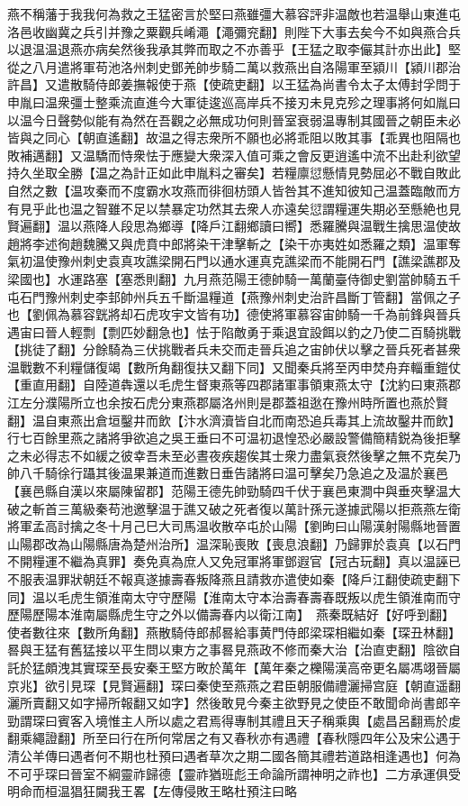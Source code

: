 燕不稱藩于我我何為救之王猛密言於堅曰燕雖彊大慕容評非温敵也若温舉山東進屯洛邑收幽冀之兵引并豫之粟觀兵崤澠【澠彌兖翻】則陛下大事去矣今不如與燕合兵以退温温退燕亦病矣然後我承其弊而取之不亦善乎【王猛之取李儼其計亦出此】堅從之八月遣將軍苟池洛州刺史鄧羌帥步騎二萬以救燕出自洛陽軍至潁川【潁川郡治許昌】又遣散騎侍郎姜撫報使于燕【使疏吏翻】以王猛為尚書令太子太傅封孚問于申胤曰温衆彊士整乘流直進今大軍徒逡巡高岸兵不接刃未見克殄之理事將何如胤曰以温今日聲勢似能有為然在吾觀之必無成功何則晉室衰弱温專制其國晉之朝臣未必皆與之同心【朝直遙翻】故温之得志衆所不願也必將乖阻以敗其事【乖異也阻隔也敗補邁翻】又温驕而恃衆怯于應變大衆深入值可乘之會反更逍遙中流不出赴利欲望持久坐取全勝【温之為計正如此申胤料之審矣】若糧廪愆懸情見勢屈必不戰自敗此自然之數【温攻秦而不度霸水攻燕而徘徊枋頭人皆咎其不進知彼知己温蓋臨敵而方有見乎此也温之智雖不足以禁暴定功然其去衆人亦遠矣愆謂糧運失期必至懸絶也見賢遍翻】温以燕降人段思為鄉導【降戶江翻鄉讀曰嚮】悉羅騰與温戰生擒思温使故趙將李述徇趙魏騰又與虎賁中郎將染干津擊斬之【染干亦夷姓如悉羅之類】温軍奪氣初温使豫州刺史袁真攻譙梁開石門以通水運真克譙梁而不能開石門【譙梁譙郡及梁國也】水運路塞【塞悉則翻】九月燕范陽王德帥騎一萬蘭臺侍御史劉當帥騎五千屯石門豫州刺史李邽帥州兵五千斷温糧道【燕豫州刺史治許昌斷丁管翻】當佩之子也【劉佩為慕容皝將却石虎攻宇文皆有功】德使將軍慕容宙帥騎一千為前鋒與晉兵遇宙曰晉人輕剽【剽匹妙翻急也】怯于陷敵勇于乘退宜設餌以釣之乃使二百騎挑戰【挑徒了翻】分餘騎為三伏挑戰者兵未交而走晉兵追之宙帥伏以擊之晉兵死者甚衆温戰數不利糧儲復竭【數所角翻復扶又翻下同】又聞秦兵將至丙申焚舟弃輜重鎧仗【重直用翻】自陸道犇還以毛虎生督東燕等四郡諸軍事領東燕太守【沈約曰東燕郡江左分濮陽所立也余按石虎分東燕郡屬洛州則是郡蓋祖逖在豫州時所置也燕於賢翻】温自東燕出倉垣鑿井而飲【汴水濟瀆皆自北而南恐追兵毒其上流故鑿井而飲】行七百餘里燕之諸將爭欲追之吳王垂曰不可温初退惶恐必嚴設警備簡精鋭為後拒擊之未必得志不如緩之彼幸吾未至必晝夜疾趨俟其士衆力盡氣衰然後擊之無不克矣乃帥八千騎徐行躡其後温果兼道而進數日垂告諸將曰温可擊矣乃急追之及温於襄邑【襄邑縣自漢以來屬陳留郡】范陽王德先帥勁騎四千伏于襄邑東澗中與垂夾擊温大破之斬首三萬級秦苟池邀擊温于譙又破之死者復以萬計孫元遂據武陽以拒燕燕左衛將軍孟高討擒之冬十月己巳大司馬温收散卒屯於山陽【劉昫曰山陽漢射陽縣地晉置山陽郡改為山陽縣唐為楚州治所】温深恥喪敗【喪息浪翻】乃歸罪於袁真【以石門不開糧運不繼為真罪】奏免真為庶人又免冠軍將軍鄧遐官【冠古玩翻】真以温誣已不服表温罪狀朝廷不報真遂據壽春叛降燕且請救亦遣使如秦【降戶江翻使疏吏翻下同】温以毛虎生領淮南太守守歷陽【淮南太守本治壽春壽春既叛以虎生領淮南而守歷陽歷陽本淮南屬縣虎生守之外以備壽春内以衛江南】　燕秦既結好【好呼到翻】使者數往來【數所角翻】燕散騎侍郎郝晷給事黄門侍郎梁琛相繼如秦【琛丑林翻】晷與王猛有舊猛接以平生問以東方之事晷見燕政不修而秦大治【治直吏翻】陰欲自託於猛頗洩其實琛至長安秦王堅方畋於萬年【萬年秦之櫟陽漢高帝更名屬馮翊晉屬京兆】欲引見琛【見賢遍翻】琛曰秦使至燕燕之君臣朝服備禮灑掃宫庭【朝直遥翻灑所賣翻又如字掃所報翻又如字】然後敢見今秦主欲野見之使臣不敢聞命尚書郎辛勁謂琛曰賓客入境惟主人所以處之君焉得專制其禮且天子稱乘輿【處昌呂翻焉於䖍翻乘繩證翻】所至曰行在所何常居之有又春秋亦有遇禮【春秋隱四年公及宋公遇于清公羊傳曰遇者何不期也杜預曰遇者草次之期二國各簡其禮若道路相逢遇也】何為不可乎琛曰晉室不綱靈祚歸德【靈祚猶班彪王命論所謂神明之祚也】二方承運俱受明命而桓温猖狂闚我王畧【左傳侵敗王略杜預注曰略